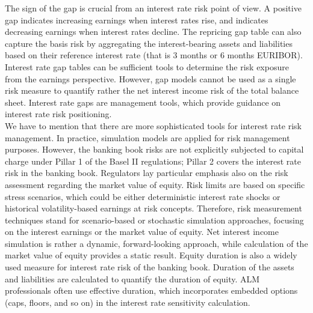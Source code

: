 \documentclass[11pt]{article}
\begin{document}
The sign of the gap is crucial from an interest rate risk point of view. A positive
gap indicates increasing earnings when interest rates rise, and indicates decreasing earnings when interest rates decline. The repricing gap table can also capture the basis risk by aggregating the interest-bearing assets and liabilities based on their reference interest rate (that is 3 months or 6 months EURIBOR). Interest rate gap tables can be sufficient tools to determine the risk exposure from the earnings perspective. However, gap models cannot be used as a single risk measure to quantify rather the net interest income risk of the total balance sheet. Interest rate gaps are management tools, which provide guidance on interest rate risk positioning.\\

We have to mention that there are more sophisticated tools for interest rate risk management. In practice, simulation models are applied for risk management purposes. However, the banking book risks are not explicitly subjected to capital charge under Pillar 1 of the Basel II regulations; Pillar 2 covers the interest rate
risk in the banking book. Regulators lay particular emphasis also on the risk assessment regarding the market value of equity. Risk limits are based on specific stress scenarios, which could be either deterministic interest rate shocks or historical volatility-based earnings at risk concepts. Therefore, risk measurement techniques stand for scenario-based or stochastic simulation approaches, focusing on the interest earnings or the market value of equity. Net interest income simulation is rather a dynamic, forward-looking approach, while calculation of the market value of equity provides a static result. Equity duration is also a widely used measure for interest rate risk of the banking book. Duration of the assets and liabilities are calculated
to quantify the duration of equity. ALM professionals often use effective duration, which incorporates embedded options (caps, floors, and so on) in the interest rate sensitivity calculation.
\end{document}
